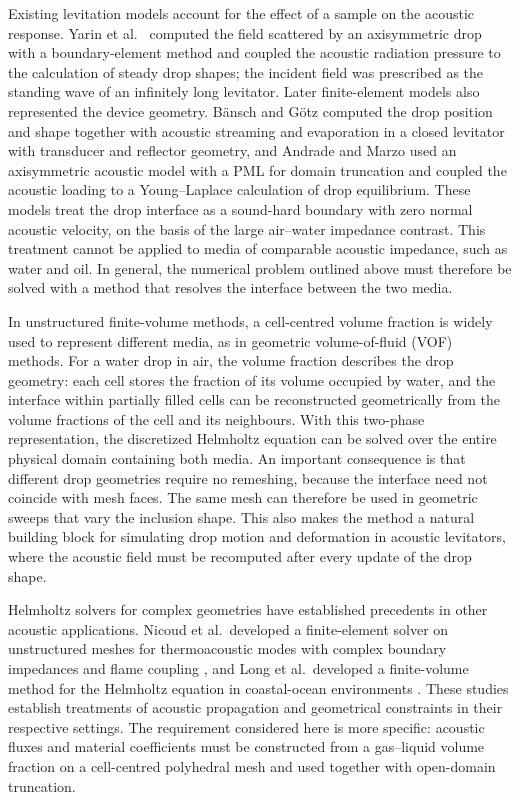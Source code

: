 \documentclass[final,12pt,nopreprintline,longtitle]{elsarticle}
\begin{document}
Existing levitation models account for the effect of a sample on the acoustic
response.  Yarin et al.\ \cite{yarin1998acoustic} computed the field
scattered by an axisymmetric drop with a boundary-element method and coupled
the acoustic radiation pressure to the calculation of steady drop shapes; the
incident field was prescribed as the standing wave of an infinitely long
levitator.  Later finite-element models also represented the device geometry.
Bänsch and Götz \cite{bansch2018numerical} computed the drop position and shape
together with acoustic streaming and evaporation in a closed levitator with
transducer and reflector geometry, and Andrade and Marzo
\cite{andrade2019numerical} used an axisymmetric acoustic model with a PML
for domain truncation and coupled the acoustic loading to a Young--Laplace
calculation of drop equilibrium.  These models treat the drop interface as a
sound-hard boundary with zero normal acoustic velocity, on the basis of the
large air--water impedance contrast.  This
treatment cannot be applied to media of comparable acoustic impedance, such
as water and oil.  In general, the numerical problem outlined above must
therefore be solved with a method that resolves the interface between the two
media.

In unstructured finite-volume methods, a cell-centred volume fraction is
widely used to represent different media, as in geometric volume-of-fluid
(VOF) methods.  For a water drop in air, the volume fraction describes the
drop geometry: each cell stores the fraction of its volume occupied by water,
and the interface within partially filled cells can be reconstructed
geometrically from the volume fractions of the cell and its neighbours.  With
this two-phase representation, the discretized Helmholtz equation can be
solved over the entire physical domain containing both media.  An important
consequence is that different drop geometries require no remeshing, because
the interface need not coincide with mesh faces.  The same mesh can therefore
be used in geometric sweeps that vary the inclusion shape.  This also makes
the method a natural
building block for simulating drop motion and deformation in acoustic
levitators, where the acoustic field must be recomputed after every update of
the drop shape.

Helmholtz solvers for complex geometries have established precedents in other
acoustic applications.  Nicoud et al.\ developed a finite-element solver on
unstructured meshes for thermoacoustic modes with complex boundary impedances
and flame coupling \cite{Nicoud2007}, and Long et al.\ developed a
finite-volume method for the Helmholtz equation in coastal-ocean environments
\cite{Long2015}.  These studies establish treatments of acoustic propagation
and geometrical constraints in their respective settings.  The requirement considered here is
more specific: acoustic fluxes and material coefficients must be constructed
from a gas--liquid volume fraction on a cell-centred polyhedral mesh and used
together with open-domain truncation.
\end{document}
